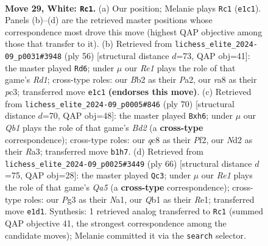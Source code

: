 \documentclass[11pt]{article}
\begin{document}
\clearpage

\begin{figure}[p]\centering
\begin{subfigure}{0.46\textwidth}\centering
\resizebox{\linewidth}{!}{%
\newchessgame
\chessboard[
  setfen={r1q1k2r/p3b1pp/8/n2p4/p2P3P/4P1P1/1B1N2K1/1Q2R3 w - - 0 29},
  showmover=false,
  pgfstyle=straightmove, color=movearrow, markmove={e1-c1}
]}
\caption{}
\end{subfigure}\hfill
\begin{subfigure}{0.46\textwidth}\centering
\resizebox{\linewidth}{!}{%
\newchessgame
\chessboard[
  setfen={2r3k1/pp3p2/2q2bpp/8/8/2p1PPBP/P5P1/1Q1R2K1 w - - 0 29},
  showmover=false,
  pgfstyle=straightmove, color=movearrow, markmove={d1-d6}
]}
\caption{}
\end{subfigure}
\\[4pt]
\begin{subfigure}{0.46\textwidth}\centering
\resizebox{\linewidth}{!}{%
\newchessgame
\chessboard[
  setfen={r6k/pp1bq3/3p2Bp/3n4/P2p4/R5QP/1P1B1P2/5K2 w - - 0 36},
  showmover=false,
  pgfstyle=straightmove, color=movearrow, markmove={d2-h6}
]}
\caption{}
\end{subfigure}\hfill
\begin{subfigure}{0.46\textwidth}\centering
\resizebox{\linewidth}{!}{%
\newchessgame
\chessboard[
  setfen={1r4k1/1q4pb/2p1p2p/Q1P5/3P1pP1/1P3P2/7P/N3R1K1 w - - 3 34},
  showmover=false,
  pgfstyle=straightmove, color=movearrow, markmove={a5-c3}
]}
\caption{}
\end{subfigure}
\caption{\textbf{Move 29, White: \texttt{Rc1}.} (a) Our position; Melanie plays \texttt{Rc1} (\texttt{e1c1}). Panels (b)--(d) are the retrieved master positions whose correspondence most drove this move (highest QAP objective among those that transfer to it). (b) Retrieved from \texttt{lichess\_elite\_2024-09\_p0031\#3948} (ply 56) [structural distance $d$=73, QAP obj=41]: the master played \texttt{Rd6}; under $\mu$ our \emph{Re1} plays the role of that game's \emph{Rd1}; cross-type roles: our \emph{B}b2 as their \emph{P}a2, our \emph{r}a8 as their \emph{p}c3; transferred move \texttt{e1c1} \textbf{(endorses this move)}. (c) Retrieved from \texttt{lichess\_elite\_2024-09\_p0005\#846} (ply 70) [structural distance $d$=70, QAP obj=48]: the master played \texttt{Bxh6}; under $\mu$ our \emph{Qb1} plays the role of that game's \emph{Bd2} (a \textbf{cross-type} correspondence); cross-type roles: our \emph{q}c8 as their \emph{P}f2, our \emph{N}d2 as their \emph{R}a3; transferred move \texttt{b1h7}. (d) Retrieved from \texttt{lichess\_elite\_2024-09\_p0025\#3449} (ply 66) [structural distance $d$=75, QAP obj=28]: the master played \texttt{Qc3}; under $\mu$ our \emph{Re1} plays the role of that game's \emph{Qa5} (a \textbf{cross-type} correspondence); cross-type roles: our \emph{P}g3 as their \emph{N}a1, our \emph{Q}b1 as their \emph{R}e1; transferred move \texttt{e1d1}. Synthesis: 1 retrieved analog transferred to \texttt{Rc1} (summed QAP objective 41, the strongest correspondence among the candidate moves); Melanie committed it via the \texttt{search} selector.}
\label{fig:thought-m56}
\end{figure}
\end{document}
